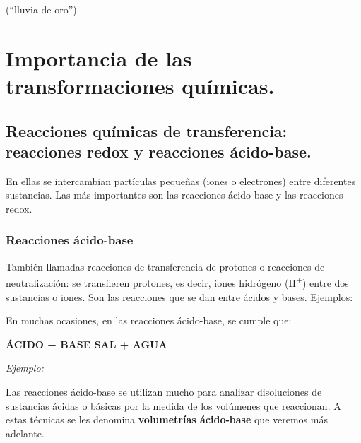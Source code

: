 \documentclass[
  spanish,
]{article}
\begin{document}
 (``lluvia de oro'')


\hypertarget{importancia-de-las-transformaciones-quuxedmicas.}{%
\section{Importancia de las transformaciones
químicas.}\label{importancia-de-las-transformaciones-quuxedmicas.}}

\hypertarget{reacciones-quuxedmicas-de-transferencia-reacciones-redox-y-reacciones-uxe1cido-base.}{%
\subsection{Reacciones químicas de transferencia: reacciones redox y
reacciones
ácido-base.}\label{reacciones-quuxedmicas-de-transferencia-reacciones-redox-y-reacciones-uxe1cido-base.}}

En ellas se intercambian partículas pequeñas (iones o electrones) entre
diferentes sustancias. Las más importantes son las reacciones ácido-base
y las reacciones redox.

\hypertarget{reacciones-uxe1cido-base}{%
\subsubsection{Reacciones ácido-base}\label{reacciones-uxe1cido-base}}

También llamadas reacciones de transferencia de protones o reacciones de
neutralización: se transfieren protones, es decir, iones hidrógeno
(H\textsuperscript{+}) entre dos sustancias o iones. Son las reacciones
que se dan entre ácidos y bases. Ejemplos:




En muchas ocasiones, en las reacciones ácido-base, se cumple que:

\textbf{ÁCIDO + BASE SAL + AGUA}

\emph{Ejemplo:} 

Las reacciones ácido-base se utilizan mucho para analizar disoluciones
de sustancias ácidas o básicas por la medida de los volúmenes que
reaccionan. A estas técnicas se les denomina \textbf{volumetrías
ácido-base} que veremos más adelante.
\end{document}
